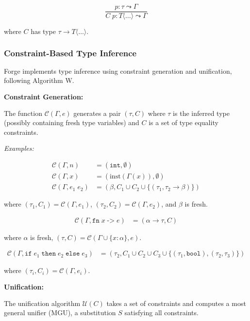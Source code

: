 \documentclass[conference,onecolumn]{IEEEtran}
\begin{document}
$$\frac{p : \tau \leadsto \Gamma}{C \; p : T\langle\ldots\rangle \leadsto \Gamma}$$

where $C$ has type $\tau \to T\langle\ldots\rangle$.

\subsubsection{Constraint-Based Type Inference}

Forge implements type inference using constraint generation and unification, following Algorithm W.

\textbf{Constraint Generation:}

The function $\mathcal{C}(\Gamma, e)$ generates a pair $(\tau, C)$ where $\tau$ is the inferred type (possibly containing fresh type variables) and $C$ is a set of type equality constraints.

\textit{Examples:}

\begin{align*}
\mathcal{C}(\Gamma, n) &= (\texttt{int}, \emptyset) \\
\mathcal{C}(\Gamma, x) &= (\text{inst}(\Gamma(x)), \emptyset) \\
\mathcal{C}(\Gamma, e_1 \; e_2) &= (\beta, C_1 \cup C_2 \cup \{(\tau_1, \tau_2 \to \beta)\})
\end{align*}

where $(\tau_1, C_1) = \mathcal{C}(\Gamma, e_1)$, $(\tau_2, C_2) = \mathcal{C}(\Gamma, e_2)$, and $\beta$ is fresh.

\begin{align*}
\mathcal{C}(\Gamma, \texttt{fn} \; x \; \texttt{->} \; e) &= (\alpha \to \tau, C)
\end{align*}

where $\alpha$ is fresh, $(\tau, C) = \mathcal{C}(\Gamma \cup \{x : \alpha\}, e)$.

\begin{align*}
\mathcal{C}(\Gamma, \texttt{if} \; e_1 \; \texttt{then} \; e_2 \; \texttt{else} \; e_3) &= (\tau_2, C_1 \cup C_2 \cup C_3 \cup \{(\tau_1, \texttt{bool}), (\tau_2, \tau_3)\})
\end{align*}

where $(\tau_i, C_i) = \mathcal{C}(\Gamma, e_i)$.

\textbf{Unification:}

The unification algorithm $\mathcal{U}(C)$ takes a set of constraints and computes a most general unifier (MGU), a substitution $S$ satisfying all constraints.
\end{document}
